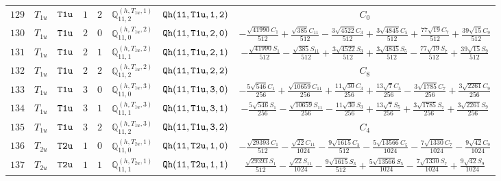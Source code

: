\documentclass[fleqn,8pt]{jsarticle}
\begin{document}
\begin{table}[ht!]
\begin{center}
\begin{tabular}{cccccccc}
$ 129 $ & $ T_{1u} $ & $ {\tt T1u} $ & $ 1 $ & $ 2 $ & $ \mathbb{Q}_{11,2}^{(h,T_{1u},1)} $ & $ {\tt Qh(11,T1u,1,2)} $ & $ C_{0} $ \\
$ 130 $ & $ T_{1u} $ & $ {\tt T1u} $ & $ 2 $ & $ 0 $ & $ \mathbb{Q}_{11,0}^{(h,T_{1u},2)} $ & $ {\tt Qh(11,T1u,2,0)} $ & $ - \frac{\sqrt{41990} C_{1}}{512} + \frac{\sqrt{385} C_{11}}{512} - \frac{3 \sqrt{4522} C_{3}}{512} + \frac{3 \sqrt{4845} C_{5}}{512} + \frac{77 \sqrt{19} C_{7}}{512} + \frac{39 \sqrt{15} C_{9}}{512} $ \\
$ 131 $ & $ T_{1u} $ & $ {\tt T1u} $ & $ 2 $ & $ 1 $ & $ \mathbb{Q}_{11,1}^{(h,T_{1u},2)} $ & $ {\tt Qh(11,T1u,2,1)} $ & $ - \frac{\sqrt{41990} S_{1}}{512} - \frac{\sqrt{385} S_{11}}{512} + \frac{3 \sqrt{4522} S_{3}}{512} + \frac{3 \sqrt{4845} S_{5}}{512} - \frac{77 \sqrt{19} S_{7}}{512} + \frac{39 \sqrt{15} S_{9}}{512} $ \\
$ 132 $ & $ T_{1u} $ & $ {\tt T1u} $ & $ 2 $ & $ 2 $ & $ \mathbb{Q}_{11,2}^{(h,T_{1u},2)} $ & $ {\tt Qh(11,T1u,2,2)} $ & $ C_{8} $ \\
$ 133 $ & $ T_{1u} $ & $ {\tt T1u} $ & $ 3 $ & $ 0 $ & $ \mathbb{Q}_{11,0}^{(h,T_{1u},3)} $ & $ {\tt Qh(11,T1u,3,0)} $ & $ - \frac{5 \sqrt{546} C_{1}}{256} + \frac{\sqrt{10659} C_{11}}{256} + \frac{11 \sqrt{30} C_{3}}{256} + \frac{13 \sqrt{7} C_{5}}{256} - \frac{3 \sqrt{1785} C_{7}}{256} + \frac{3 \sqrt{2261} C_{9}}{256} $ \\
$ 134 $ & $ T_{1u} $ & $ {\tt T1u} $ & $ 3 $ & $ 1 $ & $ \mathbb{Q}_{11,1}^{(h,T_{1u},3)} $ & $ {\tt Qh(11,T1u,3,1)} $ & $ - \frac{5 \sqrt{546} S_{1}}{256} - \frac{\sqrt{10659} S_{11}}{256} - \frac{11 \sqrt{30} S_{3}}{256} + \frac{13 \sqrt{7} S_{5}}{256} + \frac{3 \sqrt{1785} S_{7}}{256} + \frac{3 \sqrt{2261} S_{9}}{256} $ \\
$ 135 $ & $ T_{1u} $ & $ {\tt T1u} $ & $ 3 $ & $ 2 $ & $ \mathbb{Q}_{11,2}^{(h,T_{1u},3)} $ & $ {\tt Qh(11,T1u,3,2)} $ & $ C_{4} $ \\
$ 136 $ & $ T_{2u} $ & $ {\tt T2u} $ & $ 1 $ & $ 0 $ & $ \mathbb{Q}_{11,0}^{(h,T_{2u},1)} $ & $ {\tt Qh(11,T2u,1,0)} $ & $ - \frac{\sqrt{29393} C_{1}}{512} - \frac{\sqrt{22} C_{11}}{1024} - \frac{9 \sqrt{1615} C_{3}}{512} - \frac{5 \sqrt{13566} C_{5}}{1024} - \frac{7 \sqrt{1330} C_{7}}{1024} - \frac{9 \sqrt{42} C_{9}}{1024} $ \\
$ 137 $ & $ T_{2u} $ & $ {\tt T2u} $ & $ 1 $ & $ 1 $ & $ \mathbb{Q}_{11,1}^{(h,T_{2u},1)} $ & $ {\tt Qh(11,T2u,1,1)} $ & $ \frac{\sqrt{29393} S_{1}}{512} - \frac{\sqrt{22} S_{11}}{1024} - \frac{9 \sqrt{1615} S_{3}}{512} + \frac{5 \sqrt{13566} S_{5}}{1024} - \frac{7 \sqrt{1330} S_{7}}{1024} + \frac{9 \sqrt{42} S_{9}}{1024} $ \\

\end{tabular}
\end{center}
\end{table}
\end{document}
